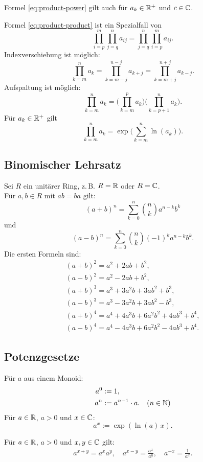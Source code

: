 Formel \eqref{eq:product-power} gilt auch für $a_k\in\mathbb R^+$ und $c\in\mathbb C$.

Formel \eqref{eq:product-product} ist ein Spezialfall von
\begin{equation}
\prod_{i=p}^m \prod_{j=q}^n a_{ij} = \prod_{j=q}^n \prod_{i=p}^m a_{ij}.
\end{equation}
Indexverschiebung ist möglich:
\begin{equation}
\prod_{k=m}^n a_k = \prod_{k=m-j}^{n-j} a_{k+j} = \prod_{k=m+j}^{n+j} a_{k-j}.
\end{equation}
Aufspaltung ist möglich:
\begin{equation}
\prod_{k=m}^n a_k = \bigg(\prod_{k=m}^p a_k\bigg)\bigg(\prod_{k=p+1}^n a_k\bigg).
\end{equation}
Für $a_k\in\mathbb R^+$ gilt
\begin{equation}
\prod_{k=m}^n a_k = \exp\bigg(\sum_{k=m}^n \ln(a_k)\bigg).
\end{equation}

\subsection{Binomischer Lehrsatz}
Sei $R$ ein unitärer Ring, z.\,B. $R=\mathbb R$ oder $R=\mathbb C$.\\
Für $a,b\in R$ mit $ab=ba$ gilt:%
\begin{equation}
(a+b)^n = \sum_{k=0}^n \binom{n}{k} a^{n-k} b^k
\end{equation}
und
\begin{equation}
(a-b)^n = \sum_{k=0}^n \binom{n}{k} (-1)^k a^{n-k} b^k.
\end{equation}
Die ersten Formeln sind:
\begin{gather}
(a+b)^2 = a^2+2ab+b^2,\\
(a-b)^2 = a^2-2ab+b^2,\\
(a+b)^3 = a^3+3a^2 b+3ab^2+b^3,\\
(a-b)^3 = a^3-3a^2 b+3ab^2-b^3,\\
(a+b)^4 = a^4+4a^3 b+6a^2 b^2+4ab^3+b^4,\\
(a-b)^4 = a^4-4a^3 b+6a^2 b^2-4ab^3+b^4.
\end{gather}

\newpage
\subsection{Potenzgesetze}
\begin{definition}[Potenz]\mbox{}\newline
Für $a$ aus einem Monoid:
\begin{align}
a^0 &:= 1,\\
a^n &:= a^{n-1}\cdot a.\quad (n\in\mathbb N)
\end{align}
Für $a\in\mathbb R$, $a>0$ und $x\in\mathbb C$:
\begin{equation}
a^x := \exp(\ln(a)\,x).
\end{equation}
\end{definition}
\noindent
Für $a\in\mathbb R$, $a>0$ und $x,y\in\mathbb C$ gilt:
\begin{gather}
a^{x+y} = a^x a^y,\quad a^{x-y} = \frac{a^x}{a^y},
\quad a^{-x} = \frac{1}{a^x}.
\end{gather}

